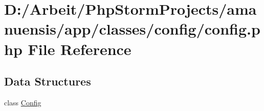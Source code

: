 \hypertarget{a00086}{}\section{D\+:/\+Arbeit/\+Php\+Storm\+Projects/amanuensis/app/classes/config/config.php File Reference}
\label{a00086}
\subsection*{Data Structures}
\begin{DoxyCompactItemize}
\item 
class \hyperlink{a00018}{Config}
\end{DoxyCompactItemize}
